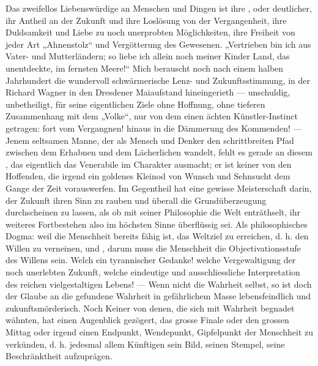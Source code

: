 Das zweifellos Liebenswürdige an Menschen und Dingen ist ihre , oder deutlicher, ihr Antheil an der Zukunft und ihre Loslösung von der Vergangenheit, ihre Duldsamkeit und Liebe zu noch unerprobten Möglichkeiten, ihre Freiheit von jeder Art „Ahnenstolz“ und Vergötterung des Gewesenen. „Vertrieben bin ich aus Vater- und Mutterländern; so liebe ich allein noch meiner Kinder Land, das unentdeckte, im fernsten Meere!“ Mich berauscht noch nach einem halben Jahrhundert die wundervoll schwärmerische Lenz- und Zukunftsstimmung, in der Richard Wagner in den Dresdener Maiaufstand hineingerieth — unschuldig, unbetheiligt, für seine eigentlichen Ziele ohne Hoffnung, ohne tieferen Zusammenhang mit dem „Volke“, nur von dem einen ächten Künstler-Instinct getragen: fort vom Vergangnen! hinaus in die Dämmerung des Kommenden! — Jenem seltsamen Manne, der als Mensch und Denker den schrittbreiten Pfad zwischen dem Erhabnen und dem Lächerlichen wandelt, fehlt es gerade an diesem , das eigentlich das Venerabile im Charakter ausmacht; er ist keiner von den Hoffenden, die irgend ein goldenes Kleinod von Wunsch und Sehnsucht dem Gange der Zeit vorauswerfen. Im Gegentheil hat  eine gewisse Meisterschaft darin, der Zukunft ihren Sinn zu rauben und überall die Grundüberzeugung durchscheinen zu lassen, als ob mit seiner Philosophie die Welt enträthselt, ihr weiteres Fortbestehen also im höchsten Sinne überflüssig sei. Als philosophisches Dogma: weil die Menschheit bereits fähig ist, das Weltziel zu erreichen, d. h. den Willen zu verneinen, und , darum muss die Menschheit die  Objectivationsstufe des Willens sein. Welch ein tyrannischer Gedanke! welche Vergewaltigung der noch unerlebten Zukunft, welche eindeutige und ausschliessliche Interpretation des reichen vielgestaltigen Lebens! — Wenn nicht die Wahrheit selbst, so ist doch der Glaube an die gefundene Wahrheit in gefährlichem Masse lebensfeindlich und zukunftsmörderisch. Noch Keiner von denen, die sich mit Wahrheit begnadet wähnten, hat einen Augenblick gezögert, das grosse Finale oder den grossen Mittag oder irgend einen Endpunkt, Wendepunkt, Gipfelpunkt der Menschheit zu verkünden, d. h. jedesmal allem Künftigen sein Bild, seinen Stempel, seine Beschränktheit aufzuprägen.
\par

